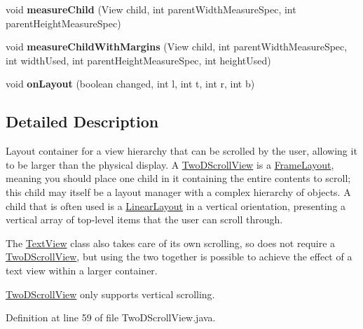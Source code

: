 \begin{DoxyCompactItemize}
void {\bfseries measure\+Child} (View child, int parent\+Width\+Measure\+Spec, int parent\+Height\+Measure\+Spec)
\item 
\mbox{\label{classcom_1_1example_1_1victorardianto_1_1myapplication_1_1widget_1_1_two_d_scroll_view_a3acb89da3af9ccbb6b22aaee48639d6b}} 
void {\bfseries measure\+Child\+With\+Margins} (View child, int parent\+Width\+Measure\+Spec, int width\+Used, int parent\+Height\+Measure\+Spec, int height\+Used)
\item 
\mbox{\label{classcom_1_1example_1_1victorardianto_1_1myapplication_1_1widget_1_1_two_d_scroll_view_ac0e19cba05fdb321a385ff37b7e1296a}} 
void {\bfseries on\+Layout} (boolean changed, int l, int t, int r, int b)
\end{DoxyCompactItemize}


\subsection{Detailed Description}
Layout container for a view hierarchy that can be scrolled by the user, allowing it to be larger than the physical display. A \mbox{\hyperlink{classcom_1_1example_1_1victorardianto_1_1myapplication_1_1widget_1_1_two_d_scroll_view}{Two\+D\+Scroll\+View}} is a \mbox{\hyperlink{}{Frame\+Layout}}, meaning you should place one child in it containing the entire contents to scroll; this child may itself be a layout manager with a complex hierarchy of objects. A child that is often used is a \mbox{\hyperlink{}{Linear\+Layout}} in a vertical orientation, presenting a vertical array of top-\/level items that the user can scroll through.

The \mbox{\hyperlink{}{Text\+View}} class also takes care of its own scrolling, so does not require a \mbox{\hyperlink{classcom_1_1example_1_1victorardianto_1_1myapplication_1_1widget_1_1_two_d_scroll_view}{Two\+D\+Scroll\+View}}, but using the two together is possible to achieve the effect of a text view within a larger container.

\mbox{\hyperlink{classcom_1_1example_1_1victorardianto_1_1myapplication_1_1widget_1_1_two_d_scroll_view}{Two\+D\+Scroll\+View}} only supports vertical scrolling. 

Definition at line 59 of file Two\+D\+Scroll\+View.\+java.



